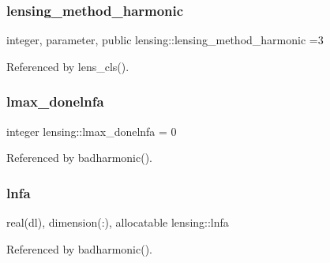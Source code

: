 \subsubsection{\texorpdfstring{lensing\+\_\+method\+\_\+harmonic}{lensing\_method\_harmonic}}
{\footnotesize\ttfamily integer, parameter, public lensing\+::lensing\+\_\+method\+\_\+harmonic =3}



Referenced by lens\+\_\+cls().

\mbox{\label{namespacelensing_aa8604328cfd9ca10730507837b4867fe}} 
\subsubsection{\texorpdfstring{lmax\+\_\+donelnfa}{lmax\_donelnfa}}
{\footnotesize\ttfamily integer lensing\+::lmax\+\_\+donelnfa = 0\hspace{0.3cm}{\ttfamily [private]}}



Referenced by badharmonic().

\mbox{\label{namespacelensing_aa64764c9338c8a6fc4f30497223a0b67}} 
\subsubsection{\texorpdfstring{lnfa}{lnfa}}
{\footnotesize\ttfamily real(dl), dimension(\+:), allocatable lensing\+::lnfa\hspace{0.3cm}{\ttfamily [private]}}



Referenced by badharmonic().

